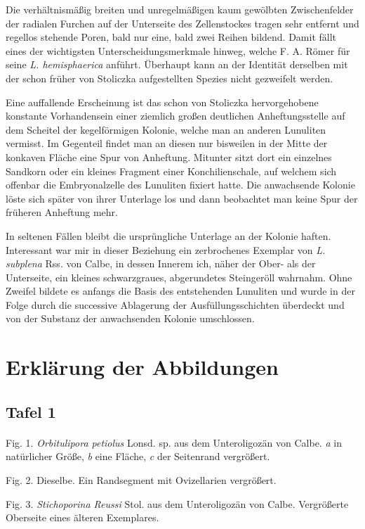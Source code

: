 \documentclass[a4paper, 11pt, oneside, german]{article}
\begin{document}
Die verhältnismäßig breiten und unregelmäßigen kaum gewölbten Zwischenfelder der radialen Furchen auf der Unterseite des Zellenstockes tragen sehr entfernt und regellos stehende Poren, bald nur eine, bald zwei Reihen bildend. Damit fällt eines der wichtigsten Unterscheidungsmerkmale hinweg, welche F. A. Römer für seine \emph{L. hemisphaerica} anführt. Überhaupt kann an der Identität derselben mit der schon früher von Stoliczka aufgestellten Spezies nicht gezweifelt werden.

Eine auffallende Erscheinung ist das schon von Stoliczka hervorgehobene konstante Vorhandensein einer ziemlich großen deutlichen Anheftungsstelle auf dem Scheitel der kegelförmigen Kolonie, welche man an anderen Lunuliten vermisst. Im Gegenteil findet man an diesen nur bisweilen in der Mitte der konkaven Fläche eine Spur von Anheftung. Mitunter sitzt dort ein einzelnes Sandkorn oder ein kleines Fragment einer Konchilienschale, auf welchem sich offenbar die Embryonalzelle des Lunuliten fixiert hatte. Die anwachsende Kolonie löste sich später von ihrer Unterlage los und dann beobachtet man keine Spur der früheren Anheftung mehr.

In seltenen Fällen bleibt die ursprüngliche Unterlage an der Kolonie haften. Interessant war mir in dieser Beziehung ein zerbrochenes Exemplar von \emph{L. subplena} Rss. von Calbe, in dessen Innerem ich, näher der Ober- als der Unterseite, ein kleines schwarzgraues, abgerundetes Steingeröll wahrnahm. Ohne Zweifel bildete es anfangs die Basis des entstehenden Lunuliten und wurde in der Folge durch die successive Ablagerung der Ausfüllungsschichten überdeckt und von der Substanz der anwachsenden Kolonie umschlossen.
\clearpage
\section{Erklärung der Abbildungen}
\subsection{Tafel 1}
\paragraph{}
Fig. 1. \emph{Orbitulipora petiolus} Lonsd. sp. aus dem Unteroligozän von Calbe. \emph{a} in natürlicher Größe, \emph{b} eine Fläche, \emph{c} der Seitenrand vergrößert.

Fig. 2. Dieselbe. Ein Randsegment mit Ovizellarien vergrößert.

Fig. 3. \emph{Stichoporina Reussi} Stol. aus dem Unteroligozän von Calbe. Vergrößerte Oberseite eines älteren Exemplares.
\end{document}
